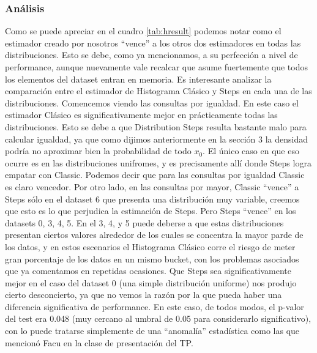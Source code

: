 \subsubsection*{Análisis}
Como se puede apreciar en el cuadro \ref{tab:hresult} podemos notar como el estimador creado por nosotros ``vence'' a los otros dos estimadores en todas las distribuciones. Esto se debe, como ya mencionamos, a su perfección a nivel de performance, aunque nuevamente vale recalcar que asume fuertemente que todos los elementos del dataset entran en memoria.
Es interesante analizar la comparación entre el estimador de Histograma Clásico y Steps en cada una de las distribuciones. Comencemos viendo las consultas por igualdad. En este caso el estimador Clásico es significativamente mejor en prácticamente todas las distribuciones. Esto se debe a que Distribution Steps resulta bastante malo para calcular igualdad, ya que como dijimos anteriormente en la sección 3 la densidad podría no aproximar bien la probabilidad de todo $x_0$. El único caso en que eso ocurre es en las distribuciones unifromes, y es precisamente allí donde Steps logra empatar con Classic. Podemos decir que para las consultas por igualdad Classic es claro vencedor.
Por otro lado, en las consultas por mayor, Classic ``vence'' a Steps sólo en el dataset 6 que presenta una distribución muy variable, creemos que esto es lo que perjudica la estimación de Steps. Pero Steps ``vence'' en los datasets 0, 3, 4, 5. En el 3, 4, y 5 puede deberse a que estas distribuciones presentan ciertos valores alrededor de los cuales se concentra la mayor parde de los datos, y en estos escenarios el Histograma Clásico corre el riesgo de meter gran porcentaje de los datos en un mismo bucket, con los problemas asociados que ya comentamos en repetidas ocasiones. Que Steps sea significativamente mejor en el caso del dataset 0 (una simple distribución uniforme) nos produjo cierto desconcierto, ya que no vemos la razón por la que pueda haber una diferencia significativa de performance. En este caso, de todos modos, el p-valor del test era 0.048 (muy cercano al umbral de 0.05 para considerarlo significativo), con lo puede tratarse simplemente de una ``anomalía'' estadística como las que mencionó Facu en la clase de presentación del TP.